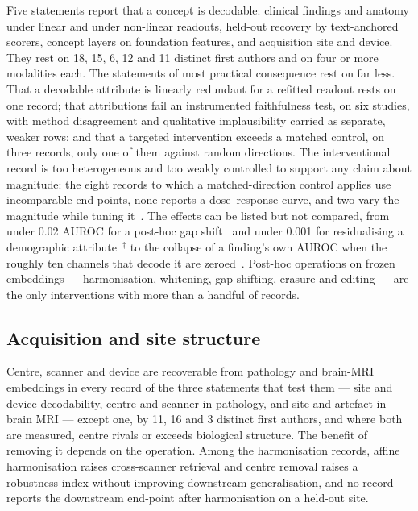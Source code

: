 Five statements report that a concept is decodable: clinical findings and anatomy under linear and under
non-linear readouts, held-out recovery by text-anchored scorers, concept layers on foundation features,
and acquisition site and device. They rest on 18, 15, 6, 12 and 11 distinct first authors and on four or
more modalities each. The statements of most practical consequence rest on far less. That a decodable
attribute is linearly redundant for a refitted readout rests on one record; that attributions fail an
instrumented faithfulness test, on six studies, with method disagreement and qualitative implausibility
carried as separate, weaker rows; and that a targeted intervention exceeds a matched control, on three
records, only one of them against random directions. The interventional record is too heterogeneous and too weakly
controlled to support any claim about magnitude: the eight records to which a matched-direction control
applies use incomparable end-points, none reports a dose--response curve, and two vary the magnitude
while tuning it~\cite{chen2026vihd,nooralahzadeh2026universal}. The effects can be listed but not
compared, from under 0.02 AUROC for a post-hoc gap shift~\cite{restrepo2026cone} and under 0.001 for
residualising a demographic attribute~\cite{kim2026encoding}$^{\dagger}$ to the collapse of a finding's
own AUROC when the roughly ten channels that decode it are zeroed~\cite{nooralahzadeh2026sparse}.
Post-hoc operations on frozen embeddings --- harmonisation, whitening, gap shifting, erasure and
editing --- are the only interventions with more than a handful of records.

\subsection{Acquisition and site structure}

Centre, scanner and device are recoverable from pathology and brain-MRI embeddings in every record of
the three statements that test them --- site and device decodability, centre and scanner in pathology,
and site and artefact in brain MRI --- except one, by 11, 16 and 3 distinct first authors, and where both
are measured, centre rivals or exceeds biological structure. The benefit of removing it depends on the
operation. Among the harmonisation records, affine harmonisation raises cross-scanner retrieval and
centre removal raises a robustness index without improving downstream generalisation, and no record
reports the downstream end-point after harmonisation on a held-out site.

